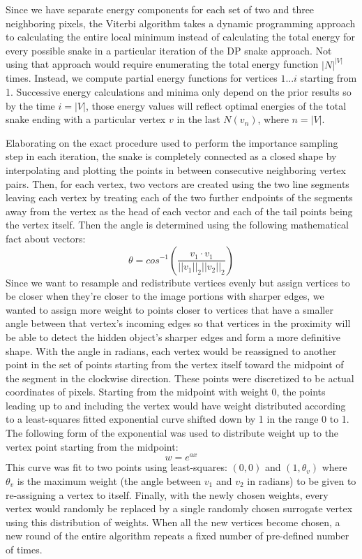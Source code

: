 \documentclass[twoside]{article}
\begin{document}
\begin{multicols}{2}
Since we have separate energy components for each set of two and three neighboring pixels, the Viterbi algorithm takes a dynamic programming approach to calculating the entire local minimum instead of calculating the total energy for every possible snake in a particular iteration of the DP snake approach. Not using that approach would require enumerating the total energy function $|N|^{|V|}$ times. Instead, we compute partial energy functions for vertices $1...i$ starting from 1. Successive energy calculations and minima only depend on the prior results so by the time $i=|V|$, those energy values will reflect optimal energies of the total snake ending with a particular vertex $v$ in the last $N(v_n)$, where $n=|V|$.
\par
Elaborating on the exact procedure used to perform the importance sampling step in each iteration, the snake is completely connected as a closed shape by interpolating and plotting the points in between consecutive neighboring vertex pairs. Then, for each vertex, two vectors are created using the two line segments leaving each vertex by treating each of the two further endpoints of the segments away from the vertex as the head of each vector and each of the tail points being the vertex itself. Then the angle is determined using the following mathematical fact about vectors: 
\begin{equation}
\theta = cos^{-1}(\frac{v_1 \cdot v_1}{||v_1||_2 ||v_2||_2})
\end{equation}
 Since we want to resample and redistribute vertices evenly but assign vertices to be closer when they're closer to the image portions with sharper edges, we wanted to assign more weight to points closer to vertices that have a smaller angle between that vertex's incoming edges so that vertices in the proximity will be able to detect the hidden object's sharper edges and form a more definitive shape. With the angle in radians, each vertex would be reassigned to another point in the set of points starting from the vertex itself toward the midpoint of the segment in the clockwise direction. These points were discretized to be actual coordinates of pixels. Starting from the midpoint with weight 0, the points leading up to and including the vertex would have weight distributed according to a least-squares fitted exponential curve shifted down by 1 in the range 0 to 1. The following form of the exponential was used to distribute weight up to the vertex point starting from the midpoint:
 \begin{equation}
w = e^{ax}
\end{equation}
This curve was fit to two points using least-squares: $(0,0)$ and $(1,\theta_v)$ where $\theta_v$ is the maximum weight (the angle between $v_1$ and $v_2$ in radians) to be given to re-assigning a vertex to itself. Finally, with the newly chosen weights, every vertex would randomly be replaced by a single randomly chosen surrogate vertex using this distribution of weights. When all the new vertices become chosen, a new round of the entire algorithm repeats a fixed number of pre-defined number of times. 


\end{multicols}
\end{document}
